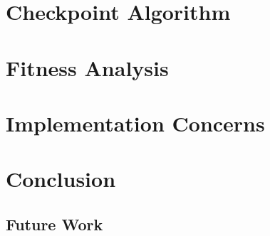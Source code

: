 \documentclass[conference]{IEEEtran}
\begin{document}
\section{Checkpoint Algorithm}
\label{s-algorithm}

\section{Fitness Analysis}
\label{s-analysis}

\section{Implementation Concerns}
\label{s-implementation}

\section{Conclusion}
\label{s-conclusion}
\subsection{Future Work}
 


\end{document}
